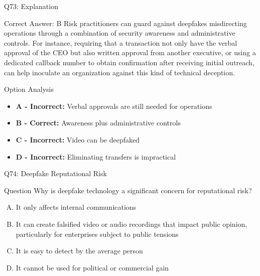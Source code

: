 \documentclass{beamer}
\begin{document}
	\begin{frame}{Q73: Explanation}
		\begin{block}{Correct Answer: B}
			Risk practitioners can guard against deepfakes misdirecting operations through a combination of security awareness and administrative controls. For instance, requiring that a transaction not only have the verbal approval of the CEO but also written approval from another executive, or using a dedicated callback number to obtain confirmation after receiving initial outreach, can help inoculate an organization against this kind of technical deception.
		\end{block}
		\begin{block}{Option Analysis}
			\begin{itemize}
				\item \textbf{A - Incorrect:} Verbal approvals are still needed for operations
				\item \textbf{B - Correct:} Awareness plus administrative controls
				\item \textbf{C - Incorrect:} Video can be deepfaked
				\item \textbf{D - Incorrect:} Eliminating transfers is impractical
			\end{itemize}
		\end{block}
	\end{frame}
	
	\begin{frame}{Q74: Deepfake Reputational Risk}
		\begin{block}{Question}
			Why is deepfake technology a significant concern for reputational risk?
		\end{block}
		\begin{enumerate}[(A)]
			\item It only affects internal communications
			\item It can create falsified video or audio recordings that impact public opinion, particularly for enterprises subject to public tensions
			\item It is easy to detect by the average person
			\item It cannot be used for political or commercial gain
		\end{enumerate}
	\end{frame}
	
\end{document}
